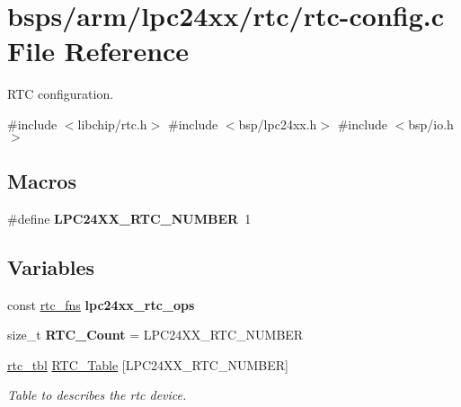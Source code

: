 \hypertarget{arm_2lpc24xx_2rtc_2rtc-config_8c}{}\section{bsps/arm/lpc24xx/rtc/rtc-\/config.c File Reference}
\label{arm_2lpc24xx_2rtc_2rtc-config_8c}


R\+TC configuration.  


{\ttfamily \#include $<$libchip/rtc.\+h$>$}\newline
{\ttfamily \#include $<$bsp/lpc24xx.\+h$>$}\newline
{\ttfamily \#include $<$bsp/io.\+h$>$}\newline
\subsection*{Macros}
\begin{DoxyCompactItemize}
\item 
\mbox{\label{arm_2lpc24xx_2rtc_2rtc-config_8c_a9475e226f6ce9080e2c8286628fd0ff1}} 
\#define {\bfseries L\+P\+C24\+X\+X\+\_\+\+R\+T\+C\+\_\+\+N\+U\+M\+B\+ER}~1
\end{DoxyCompactItemize}
\subsection*{Variables}
\begin{DoxyCompactItemize}
\item 
const \mbox{\hyperlink{struct__rtc__fns}{rtc\+\_\+fns}} {\bfseries lpc24xx\+\_\+rtc\+\_\+ops}
\item 
\mbox{\label{arm_2lpc24xx_2rtc_2rtc-config_8c_a7b04b3ddbc07be0bcfcd73fde9a9f399}} 
size\+\_\+t {\bfseries R\+T\+C\+\_\+\+Count} = L\+P\+C24\+X\+X\+\_\+\+R\+T\+C\+\_\+\+N\+U\+M\+B\+ER
\item 
\mbox{\hyperlink{struct__rtc__tbl}{rtc\+\_\+tbl}} \mbox{\hyperlink{arm_2lpc24xx_2rtc_2rtc-config_8c_a1bfa0746152bfd1b5c2eb47ef9f90e0b}{R\+T\+C\+\_\+\+Table}} \mbox{[}L\+P\+C24\+X\+X\+\_\+\+R\+T\+C\+\_\+\+N\+U\+M\+B\+ER\mbox{]}
\begin{DoxyCompactList}\small\item\em Table to describes the rtc device. \end{DoxyCompactList}\end{DoxyCompactItemize}


